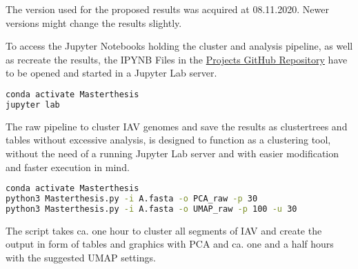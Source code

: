 The version used for the proposed results was acquired at 08.11.2020. Newer versions might change the results slightly.

To access the Jupyter Notebooks holding the cluster and analysis pipeline, as well as recreate the results, the IPYNB Files in the \href{https://github.com/ahenoch/Masterthesis.git}{Projects GitHub Repository} have to be opened and started in a Jupyter Lab server.

\begin{lstlisting}[language=sh]
conda activate Masterthesis
jupyter lab
\end{lstlisting}  

The raw pipeline to cluster \gls{IAV} genomes and save the results as clustertrees and tables without excessive analysis, is designed to function as a clustering tool, without the need of a running Jupyter Lab server and with easier modification and faster execution in mind.

\begin{lstlisting}[language=sh]
conda activate Masterthesis
python3 Masterthesis.py -i A.fasta -o PCA_raw -p 30
python3 Masterthesis.py -i A.fasta -o UMAP_raw -p 100 -u 30
\end{lstlisting}  

The script takes ca. one hour to cluster all segments of \gls{IAV} and create the output in form of tables and graphics with \gls{PCA} and ca. one and a half hours with the suggested \gls{UMAP} settings.

